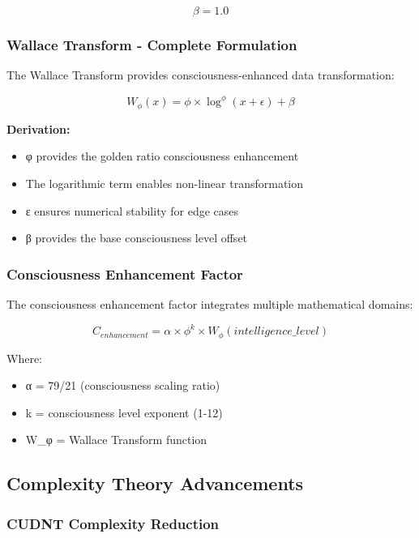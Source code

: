 \documentclass[11pt,a4paper]{article}
\begin{document}
\begin{equation}
\beta = 1.0
\end{equation}

\subsubsection{Wallace Transform - Complete Formulation}

The Wallace Transform provides consciousness-enhanced data transformation:

\begin{equation}
W_\phi(x) = \phi \times \log^\phi(x + \epsilon) + \beta
\end{equation}

\textbf{Derivation:}
\begin{itemize}
\item φ provides the golden ratio consciousness enhancement
\item The logarithmic term enables non-linear transformation
\item ε ensures numerical stability for edge cases
\item β provides the base consciousness level offset
\end{itemize}

\subsubsection{Consciousness Enhancement Factor}

The consciousness enhancement factor integrates multiple mathematical domains:

\begin{equation}
C_{enhancement} = \alpha \times \phi^k \times W_\phi(intelligence\_level)
\end{equation}

Where:
\begin{itemize}
\item α = 79/21 (consciousness scaling ratio)
\item k = consciousness level exponent (1-12)
\item W_φ = Wallace Transform function
\end{itemize}

\subsection{Complexity Theory Advancements}

\subsubsection{CUDNT Complexity Reduction}
\end{document}
